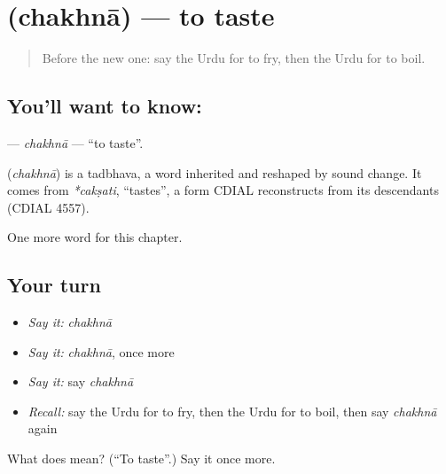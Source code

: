 \section[\texorpdfstring{\ur{چکھنا} (chakhnā)}{چکھنا (chakhnā)}]{ (chakhnā) — to taste}

\label{lesson:UR-C212-chakhna}



\begin{quote}
Before the new one: say the Urdu for to fry, then the Urdu for to boil.
\end{quote}

\subsection*{You'll want to know: }
\textbf{} — \emph{chakhnā} — \textquotedblleft{}to taste\textquotedblright{}.

\begin{cousinweb}
\textbf{} (\emph{chakhnā}) is a tadbhava, a word inherited and reshaped by sound change. It comes from \emph{*cakṣati}, \textquotedblleft{}tastes\textquotedblright{}, a form CDIAL reconstructs from its descendants (CDIAL 4557).
\end{cousinweb}

\begin{grammarlens}[title={What you've built}]
One more word for this chapter.
\end{grammarlens}

\subsection*{Your turn}
\begin{itemize}
\raggedright
  \item \emph{Say it:} \emph{chakhnā}
  \item \emph{Say it:} \emph{chakhnā}, once more
  \item \emph{Say it:} say \emph{chakhnā}
  \item \emph{Recall:} say the Urdu for to fry, then the Urdu for to boil, then say \emph{chakhnā} again
\end{itemize}

\begin{tcolorbox}[breakable,colback=teal!4,colframe=teal!35!black,title={Before you move on}]
What does  mean? (\textquotedblleft{}To taste\textquotedblright{}.) Say it once more.
\end{tcolorbox}
